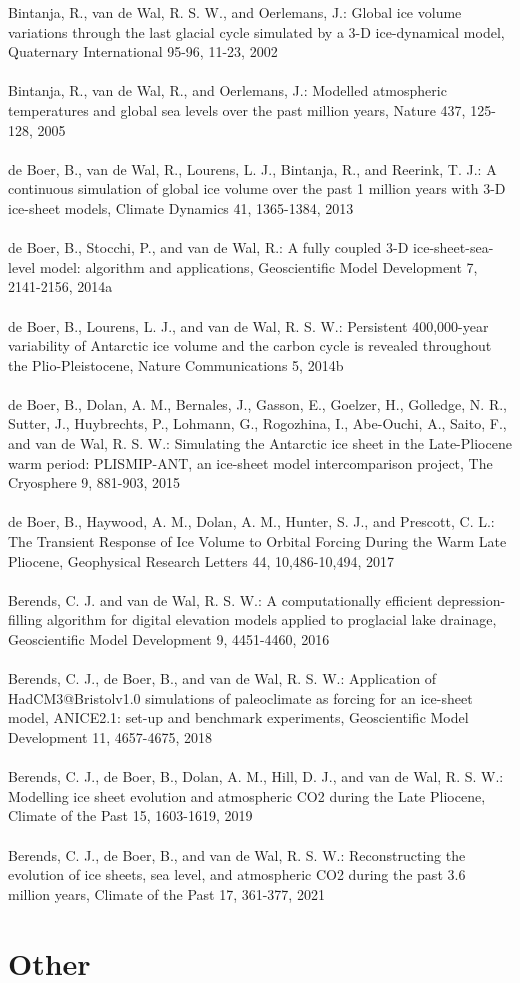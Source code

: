 \documentclass{article}
\begin{document}
Bintanja, R., van de Wal, R. S. W., and Oerlemans, J.: Global ice volume variations through the last glacial cycle simulated by a 3-D ice-dynamical model, Quaternary International 95-96, 11-23, 2002\\
\\
Bintanja, R., van de Wal, R., and Oerlemans, J.: Modelled atmospheric temperatures and global sea levels over the past million years, Nature 437, 125-128, 2005\\
\\
de Boer, B., van de Wal, R., Lourens, L. J., Bintanja, R., and Reerink, T. J.: A continuous simulation of global ice volume over the past 1 million years with 3-D ice-sheet models, Climate Dynamics 41, 1365-1384, 2013\\
\\
de Boer, B., Stocchi, P., and van de Wal, R.: A fully coupled 3-D ice-sheet-sea-level model: algorithm and applications, Geoscientific Model Development 7, 2141-2156, 2014a\\
\\
de Boer, B., Lourens, L. J., and van de Wal, R. S. W.: Persistent 400,000-year variability of Antarctic ice volume and the carbon cycle is revealed throughout the Plio-Pleistocene, Nature Communications 5, 2014b\\
\\
de Boer, B., Dolan, A. M., Bernales, J., Gasson, E., Goelzer, H., Golledge, N. R., Sutter, J., Huybrechts, P., Lohmann, G., Rogozhina, I., Abe-Ouchi, A., Saito, F., and van de Wal, R. S. W.: Simulating the Antarctic ice sheet in the Late-Pliocene warm period: PLISMIP-ANT, an ice-sheet model intercomparison project, The Cryosphere 9, 881-903, 2015\\
\\
de Boer, B., Haywood, A. M., Dolan, A. M., Hunter, S. J., and Prescott, C. L.: The Transient Response of Ice Volume to Orbital Forcing During the Warm Late Pliocene, Geophysical Research Letters 44, 10,486-10,494, 2017\\
\\
Berends, C. J. and van de Wal, R. S. W.: A computationally efficient depression-filling algorithm for digital elevation models applied to proglacial lake drainage, Geoscientific Model Development 9, 4451-4460, 2016\\
\\
Berends, C. J., de Boer, B., and van de Wal, R. S. W.: Application of HadCM3@Bristolv1.0 simulations of paleoclimate as forcing for an ice-sheet model, ANICE2.1: set-up and benchmark experiments, Geoscientific Model Development 11, 4657-4675, 2018\\
\\
Berends, C. J., de Boer, B., Dolan, A. M., Hill, D. J., and van de Wal, R. S. W.: Modelling ice sheet evolution and atmospheric CO2 during the Late Pliocene, Climate of the Past 15, 1603-1619, 2019\\
\\
Berends, C. J., de Boer, B., and van de Wal, R. S. W.: Reconstructing the evolution of ice sheets, sea level, and atmospheric CO2 during the past 3.6 million years, Climate of the Past 17, 361-377, 2021

\section{Other}
\end{document}
